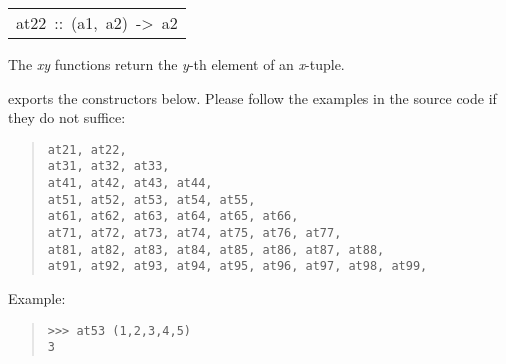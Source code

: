 \begin{haddockdesc}
\item[\begin{tabular}{@{}l}
at22\ ::\ (a1,\ a2)\ ->\ a2
\end{tabular}]\haddockbegindoc
The \emph{xy} functions return the \emph{y}-th element of an \emph{x}-tuple.\par
{} exports the constructors below. Please
 follow the examples in the source code if they do not suffice:\par
\begin{quote}
{\haddockverb\begin{verbatim}
at21, at22,
at31, at32, at33,
at41, at42, at43, at44,
at51, at52, at53, at54, at55,
at61, at62, at63, at64, at65, at66, 
at71, at72, at73, at74, at75, at76, at77,
at81, at82, at83, at84, at85, at86, at87, at88,
at91, at92, at93, at94, at95, at96, at97, at98, at99,\end{verbatim}}
\end{quote}
Example:\par
\begin{quote}
{\haddockverb\begin{verbatim}
>>> at53 (1,2,3,4,5)
3

\end{verbatim}}
\end{quote}
\end{haddockdesc}
